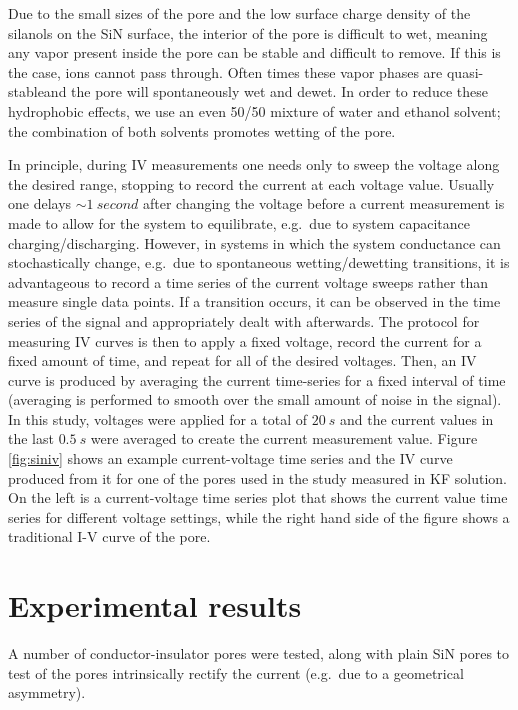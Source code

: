			Due to the small sizes of the pore and the low surface charge density of the silanols on the SiN surface, the interior of the pore is difficult to wet, meaning any vapor present inside the pore can be stable and difficult to remove. If this is the case, ions cannot pass through. Often times these vapor phases are quasi-stableand the pore will spontaneously wet and dewet. In order to reduce these hydrophobic effects, we use an even 50/50 mixture of water and ethanol solvent; the combination of both solvents promotes wetting of the pore. 
			
			In principle, during IV measurements one needs only to sweep the voltage along the desired range, stopping to record the current at each voltage value. Usually one delays $\sim\SI{1}{second}$ after changing the voltage before a current measurement is made to allow for the system to equilibrate, e.g.~due to system capacitance charging/discharging. However, in systems in which the system conductance can stochastically change, e.g.~due to spontaneous wetting/dewetting transitions, it is advantageous to record a time series of the current voltage sweeps rather than measure single data points. If a transition occurs, it can be observed in the time series of the signal and appropriately dealt with afterwards. The protocol for measuring IV curves is then to apply a fixed voltage, record the current for a fixed amount of time, and repeat for all of the desired voltages. Then, an IV curve is produced by averaging the current time-series for a fixed interval of time (averaging is performed to smooth over the small amount of noise in the signal). In this study, voltages were applied for a total of $\SI{20}{s}$ and the current values in the last $\SI{0.5}{s}$ were averaged to create the current measurement value. Figure \ref{fig:siniv} shows an example current-voltage time series and the IV curve produced from it for one of the pores used in the study measured in KF solution. On the left is a current-voltage time series plot that shows the current value time series for different voltage settings, while the right hand side of the figure shows a traditional I-V curve of the pore.  
			
			
	\section{Experimental results}
	
		A number of conductor-insulator pores were tested, along with plain SiN pores to test of the pores intrinsically rectify the current (e.g.~due to a geometrical asymmetry).
		
